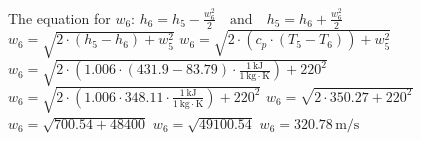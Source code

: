 The equation for \( w_6 \):  
\( h_6 = h_5 - \frac{w_6^2}{2} \quad \text{and} \quad h_5 = h_6 + \frac{w_6^2}{2} \)  
\( w_6 = \sqrt{2 \cdot \left( h_5 - h_6 \right) + w_5^2} \)  
\( w_6 = \sqrt{2 \cdot \left( c_p \cdot \left( T_5 - T_6 \right) \right) + w_5^2} \)  
\( w_6 = \sqrt{2 \cdot \left( 1.006 \cdot \left( 431.9 - 83.79 \right) \cdot \frac{1 \, \text{kJ}}{1 \, \text{kg} \cdot \text{K}} \right) + 220^2} \)  
\( w_6 = \sqrt{2 \cdot \left( 1.006 \cdot 348.11 \cdot \frac{1 \, \text{kJ}}{1 \, \text{kg} \cdot \text{K}} \right) + 220^2} \)  
\( w_6 = \sqrt{2 \cdot 350.27 + 220^2} \)  
\( w_6 = \sqrt{700.54 + 48400} \)  
\( w_6 = \sqrt{49100.54} \)  
\( w_6 = 320.78 \, \text{m/s} \)